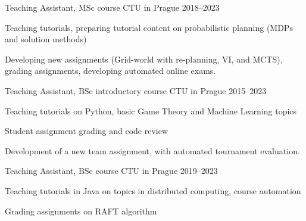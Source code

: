 \begin{cventries}


  \cventry
    {Teaching Assistant, MSc course} %
    {} %
    {CTU in Prague} %
    {2018--2023} %
    {
      \begin{cvitems} %
        \item {Teaching tutorials, preparing tutorial content on probabilistic planning (MDPs and solution methods)}
        \item {Developing new assignments (Grid-world with re-planning, VI, and MCTS), grading assignments, developing automated online exams.}
      \end{cvitems}
    }

  \cventry
    {Teaching Assistant, BSc introductory course} %
    {} %
    {CTU in Prague} %
    {2015--2023} %
    {
      \begin{cvitems} %
        \item {Teaching tutorials on Python, basic Game Theory and Machine Learning topics}
        \item {Student assignment grading and code review}
        \item {Development of a new team assignment,  with automated tournament evaluation.}
      \end{cvitems}
    }

  \cventry
    {Teaching Assistant, BSc course} %
    {} %
    {CTU in Prague} %
    {2019--2023} %
    {
      \begin{cvitems} %
        \item {Teaching tutorials in Java on topics in distributed computing, course automation}
        \item {Grading assignments on RAFT algorithm}
      \end{cvitems}
    }

\end{cventries}
    


